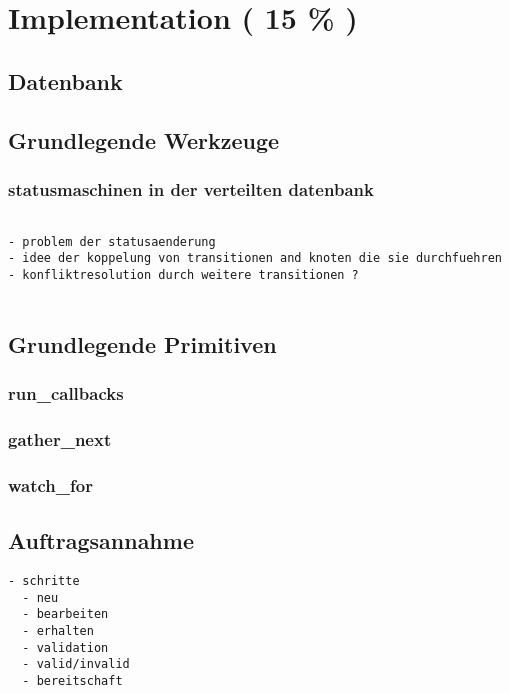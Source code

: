 \chapter{Implementation ( 15 \% ) }



\section{Datenbank}
\section{Grundlegende Werkzeuge}
\subsection{statusmaschinen in der verteilten datenbank}

\begin{verbatim}

- problem der statusaenderung
- idee der koppelung von transitionen and knoten die sie durchfuehren
- konfliktresolution durch weitere transitionen ?


\end{verbatim}
\section{Grundlegende Primitiven}

\subsection{run\_callbacks}
\subsection{gather\_next}
\subsection{watch\_for}



\section{Auftragsannahme}

\begin{verbatim}
- schritte
  - neu
  - bearbeiten
  - erhalten
  - validation
  - valid/invalid
  - bereitschaft
\end{verbatim}

